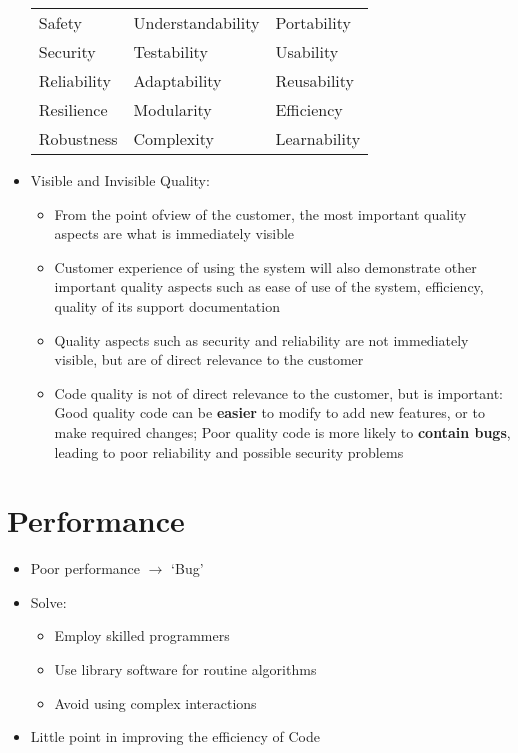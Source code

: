 \documentclass[12pt,openany]{book}
\begin{document}
\begin{itemize}
\begin{table}[H]
\begin{tabular}{lll}
            Safety & Understandability & Portability\\
            Security & Testability & Usability\\
            Reliability & Adaptability & Reusability\\
            Resilience & Modularity & Efficiency\\
            Robustness & Complexity & Learnability\\
        \end{tabular}
    \end{table}
    \item Visible and Invisible Quality:
    \begin{itemize}
        \item From the point ofview of the customer, the most important quality aspects are what is immediately visible
        \item Customer experience of using the system will also demonstrate other important quality aspects such as ease of use of the system, efficiency, quality of its support documentation
        \item Quality aspects such as security and reliability are not immediately visible, but are of direct relevance to the customer
        \item Code quality is not of direct relevance to the customer, but is important: Good quality code can be \textbf{easier} to modify to add new features, or to make required changes; Poor quality code is more likely to \textbf{contain bugs}, leading to poor reliability and possible security problems
    \end{itemize}
\end{itemize}

\section{Performance}
\begin{itemize}
    \item Poor performance $\rightarrow$ `Bug'
    \item Solve:
    \begin{itemize}
        \item Employ skilled programmers
        \item Use library software for routine algorithms
        \item Avoid using complex interactions
    \end{itemize}
    \item Little point in improving the efficiency of Code
\end{itemize}
\end{document}
